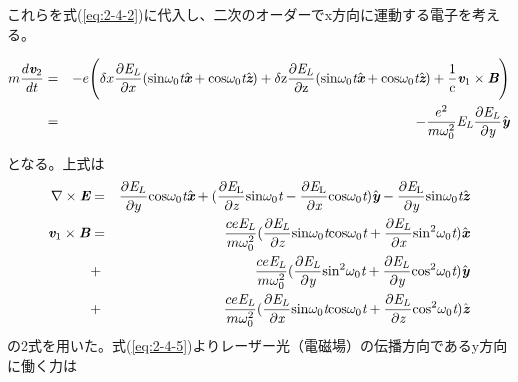 \documentclass[a4paper,11pt,titlepage]{jarticle}
\numberwithin{equation}{section} %
\begin{document}
  これらを式(\ref{eq:2-4-2})に代入し、二次のオーダーでx方向に運動する電子を考える。
  
  \begin{eqnarray}
    m \frac{d \textit{\textbf{v}}_2}{dt} &=& -e  \Biggl(\delta x \frac{\partial \textit{E}_\textit{L}}{\partial x} ( \rm{sin} \omega _0 \textit{t} \hat{\textit{\textbf{x}}} + \rm{cos} \omega _0 \textit{t} \hat{\textit{\textbf{z}}}) + \delta z \frac{\partial \textit{E}_\textit{L}}{\partial z} ( \rm{sin} \omega _0 \textit{t} \hat{\textit{\textbf{x}}} + \rm{cos} \omega _0 \textit{t} \hat{\textit{\textbf{z}}}) + \frac{1}{c} \textit{\textbf{v}}_1 \times \textit{\textbf{B}}  \Biggr)\nonumber\\
    \label{eq:2-4-5}
    &=&- \frac{e^2 }{m \omega _0^2} \textit{E}_\textit{L}\frac{\partial \textit{E}_\textit{L}}{\partial \textit{y}}\hat{\textit{\textbf{y}}}
  \end{eqnarray}
  
  
  となる。上式は
  \begin{eqnarray}
    \nabla \times \textit{\textbf{E}} &=& \frac{\partial \textit{E}_L}{\partial y} \rm{cos} \omega _0 \textit{t} \hat{\textit{\textbf{x}}} + (\frac{\partial \textit{E}_L}{\partial \textit{z}} \rm{sin} \omega _0 \textit{t} - \frac{\partial \textit{E}_L}{\partial \textit{x}} \rm{cos} \omega _0 \textit{t})\hat{\textit{\textbf{y}}} -\frac{\partial \textit{E}_L}{\partial \textit{y}} \rm{sin} \omega _0 \textit{t} \hat{\textit{\textbf{z}}}\\
    \textit{\textbf{v}}_1 \times \textit{\textbf{B}} &=& \frac{c e \textit{E}_\textit{L}}{m \omega _0^2} (\frac{\partial \textit{E}_\textit{L}}{\partial \textit{z}} \rm{sin}\omega _0 \textit{t}\rm{cos}\omega _0 \textit{t} + \frac{\partial \textit{E}_\textit{L}}{\partial \textit{x}}\rm{sin^2}\omega _0 \textit{t})\hat{\textit{\textbf{x}}}    \nonumber\\
    &+& \frac{c e \textit{E}_\textit{L}}{m \omega _0^2} (\frac{\partial \textit{E}_\textit{L}}{\partial \textit{y}} \rm{sin^2}\omega _0 \textit{t} + \frac{\partial \textit{E}_\textit{L}}{\partial \textit{y}}\rm{cos^2}\omega _0 \textit{t})\hat{\textit{\textbf{y}}}   \nonumber \\
    &+& \frac{c e \textit{E}_\textit{L}}{m \omega _0^2} (\frac{\partial \textit{E}_\textit{L}}{\partial \textit{x}} \rm{sin}\omega _0 \textit{t}\rm{cos}\omega _0 \textit{t} + \frac{\partial \textit{E}_\textit{L}}{\partial \textit{z}}\rm{cos^2}\omega _0 \textit{t})\hat{\textit{\textbf{z}}}
  \end{eqnarray}
  の2式を用いた。式(\ref{eq:2-4-5})よりレーザー光（電磁場）の伝播方向であるy方向に働く力は
  
\end{document}
